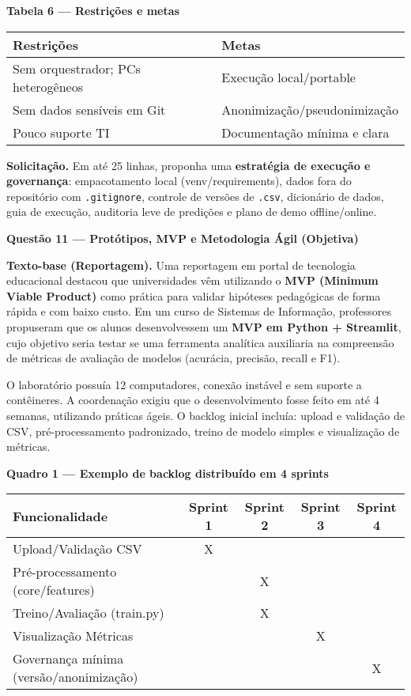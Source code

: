 \documentclass[12pt,a4paper]{article}
\begin{document}
\noindent\textbf{Tabela 6 — Restrições e metas}
\begin{center}
\begin{tabular}{p{}p{}}
\toprule
\textbf{Restrições} & \textbf{Metas}\\
\midrule
Sem orquestrador; PCs heterogêneos & Execução local/portable \\
Sem dados sensíveis em Git & Anonimização/pseudonimização \\
Pouco suporte TI & Documentação mínima e clara \\
\bottomrule
\end{tabular}
\end{center}

\noindent\textbf{Solicitação.} Em até 25 linhas, proponha uma \textbf{estratégia de execução e governança}: empacotamento local (venv/requirements), dados fora do repositório com \texttt{.gitignore}, controle de versões de \texttt{.csv}, dicionário de dados, guia de execução, auditoria leve de predições e plano de demo offline/online.



\newpage
\noindent\textbf{Questão 11 — Protótipos, MVP e Metodologia Ágil (Objetiva)}
\par\noindent\textbf{Texto-base (Reportagem).}  
Uma reportagem em portal de tecnologia educacional destacou que universidades vêm utilizando o \textbf{MVP (Minimum Viable Product)} como prática para validar hipóteses pedagógicas de forma rápida e com baixo custo. Em um curso de Sistemas de Informação, professores propuseram que os alunos desenvolvessem um \textbf{MVP em Python + Streamlit}, cujo objetivo seria testar se uma ferramenta analítica auxiliaria na compreensão de métricas de avaliação de modelos (acurácia, precisão, recall e F1).  

O laboratório possuía 12 computadores, conexão instável e sem suporte a contêineres. A coordenação exigiu que o desenvolvimento fosse feito em até 4 semanas, utilizando práticas ágeis. O backlog inicial incluía: upload e validação de CSV, pré-processamento padronizado, treino de modelo simples e visualização de métricas.  

\noindent\textbf{Quadro 1 — Exemplo de backlog distribuído em 4 sprints}
\begin{center}
\begin{tabular}{lcccc}
\toprule
\textbf{Funcionalidade} & \textbf{Sprint 1} & \textbf{Sprint 2} & \textbf{Sprint 3} & \textbf{Sprint 4}\\
\midrule
Upload/Validação CSV & X &  &  &  \\
Pré-processamento (core/features) &  & X &  &  \\
Treino/Avaliação (train.py) &  & X &  &  \\
Visualização Métricas &  &  & X &  \\
Governança mínima (versão/anonimização) &  &  &  & X \\
\bottomrule
\end{tabular}
\end{center}
\end{document}
